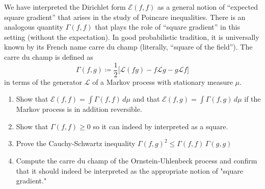 \documentclass{article}
\begin{document}
  \begin{exercise}
  We have interpreted the Dirichlet form $\mathcal{E}(f, f)$ as a general notion of “expected square gradient” that arises in the study of Poincare inequalities. There is an analogous quantity $\Gamma(f, f)$ that plays the role of “square gradient” in this setting (without the expectation). In good probabilistic tradition, it is universally known by its French name carre du champ (literally, “square of the field”). The carre du champ is defined as
  \[\Gamma(f, g) \coloneqq \frac{1}{2} \big[ \mathscr{L}(f g) - f \mathscr{L} g - g \mathscr{L} f \big] \]
  in terms of the generator $\mathscr{L}$ of a Markov process with stationary measure $\mu$. 
  \begin{enumerate}
      \item Show that $\mathcal{E}(f, f) = \int \Gamma(f, f) \, d\mu$ and that $\mathcal{E}(f, g) = \int \Gamma(f, g) \,d\mu$ if the Markov process is in addition reversible. 
      \item Show that $\Gamma(f, f) \geq 0$ so it can indeed by interpreted as a square. 
      \item Prove the Cauchy-Schwartz inequality $\Gamma(f, g)^2 \leq \Gamma(f, f) \, \Gamma(g, g)$ 
      \item Compute the carre du champ of the Ornstein-Uhlenbeck process and confirm that it should indeed be interpreted as the appropriate notion of "square gradient." 
  \end{enumerate}
  \end{exercise}
\end{document}

